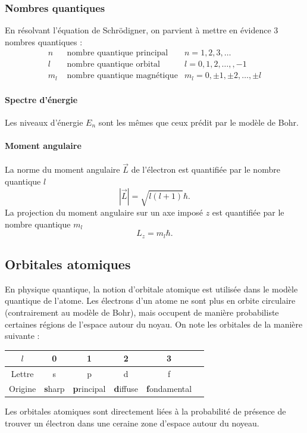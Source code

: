 \subsubsection{Nombres quantiques}
En résolvant l'équation de Schrödigner, on parvient à mettre en 
évidence 3 nombres quantiques :
\begin{align*}
	n 	&	\text{ nombre quantique principal} 	& n = 1,2,3,\dots \\
	l 	& \text{ nombre quantique orbital} 		& l = 0,1,2,\dots,,-1 \\
	m_l &	\text{ nombre quantique magnétique}	& m_l = 0,\pm 1,\pm 2,\dots,\pm l
\end{align*}

\paragraph{Spectre d'énergie}
Les niveaux d'énergie $E_n$ sont les mêmes que ceux
prédit par le modèle de Bohr. 
\paragraph{Moment angulaire}
La norme du moment angulaire $\vec{L}$ de l'électron est quantifiée
par le nombre quantique $l$
\[ |\vec{L}| = \sqrt{l(l+1)}\hbar. \]
La projection du moment angulaire sur un axe imposé $z$
est quantifiée par le nombre quantique $m_l$
\[ L_z = m_l\hbar. \]

\subsection{Orbitales atomiques}
En physique quantique, la notion d'orbitale atomique
est utilisée dans le modèle quantique de l'atome. 
Les électrons d'un atome ne sont plus en orbite circulaire
(contrairement au modèle de Bohr), mais occupent
de manière probabiliste certaines régions de l'espace
autour du noyau. On note les orbitales de
la manière suivante :

\begin{center}
  \begin{tabular}{c|ccccc}
    $l$ 		& 0 & 1 & 2 & 3 \\
    \hline
    Lettre 	& s & p & d & f \\
    Origine & {\bf s}harp & {\bf p}rincipal & {\bf d}iffuse & {\bf f}ondamental
  \end{tabular}
\end{center}

Les orbitales atomiques sont directement liées
à la probabilité de présence de trouver un électron
dans une ceraine zone d'espace autour du noyeau.

